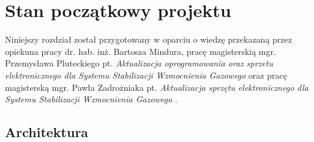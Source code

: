 
\chapter{Stan początkowy projektu}
\label{cha:pocz}

Niniejszy rozdział został przygotowany w oparciu o wiedzę przekazaną przez opiekuna pracy dr. hab. inż. Bartosza Mindura, pracę magisterskią mgr. Przemysława Pluteckiego pt. \textit{Aktualizacja oprogramowania oraz sprzetu elektronicznego dla Systemu Stabilizacji Wzmocnienia Gazowego} \cite{PluteckiMgr} oraz pracę magisterską mgr. Pawła Zadrożniaka pt. \textit{Aktualizacja sprzętu elektronicznego dla Systemu Stabilizacji Wzmocnienia Gazowego} \cite{ZadrozniakMgr}.

\section{Architektura}

